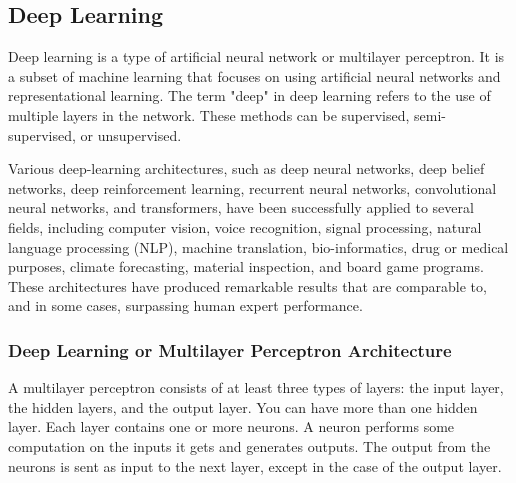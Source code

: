 \subsection{Deep Learning}
Deep learning is a type of artificial neural network or multilayer perceptron. It is a subset of machine learning that focuses on using artificial neural networks and representational learning. The term "deep" in deep learning refers to the use of multiple layers in the network. These methods can be supervised, semi-supervised, or unsupervised. \cite{vargas2017deep}

Various deep-learning architectures, such as deep neural networks, deep belief networks, deep reinforcement learning, recurrent neural networks, convolutional neural networks, and transformers, have been successfully applied to several fields, including computer vision, voice recognition, signal processing, natural language processing (NLP), machine translation, bio-informatics, drug or medical purposes, climate forecasting, material inspection, and board game programs. These architectures have produced remarkable results that are comparable to, and in some cases, surpassing human expert performance. \cite{hosseini2020deep}

\subsubsection{Deep Learning or Multilayer Perceptron Architecture}
A multilayer perceptron consists of at least three types of layers: the input layer, the hidden layers, and the output layer. You can have more than one hidden layer. Each layer contains one or more neurons. A neuron performs some computation on the inputs it gets and generates outputs. The output from the neurons is sent as input to the next layer, except in the case of the output layer.

